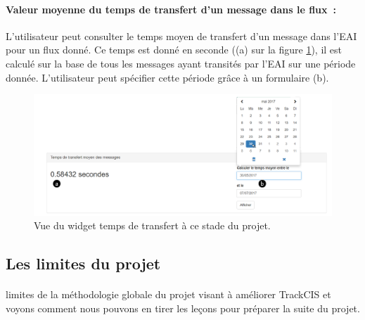 			\paragraph{Valeur moyenne du temps de transfert d'un message dans le flux~: }
			L'utilisateur peut consulter le temps moyen de transfert d'un message dans
			l'EAI pour un flux donné. Ce temps est donné en seconde ((a) sur la figure
			\ref{vue_transfer}), il est calculé sur la base de tous les messages ayant
			transités par l'EAI sur une période donnée. L'utilisateur peut spécifier
			cette période grâce à un formulaire (b).
			\begin{figure}[H]
				\centering
				\includegraphics[width=16cm]{../img/part3/vue_transfer.png}
				\caption{\label{vue_transfer} Vue du widget temps de transfert à ce stade
				du projet.}
			\end{figure}
		
		\subsection{Les limites du projet}
			\paragraph{}%
			limites de la méthodologie globale du projet visant à améliorer TrackCIS et
			voyons comment nous pouvons en tirer les leçons pour préparer la suite du
			projet.
		
